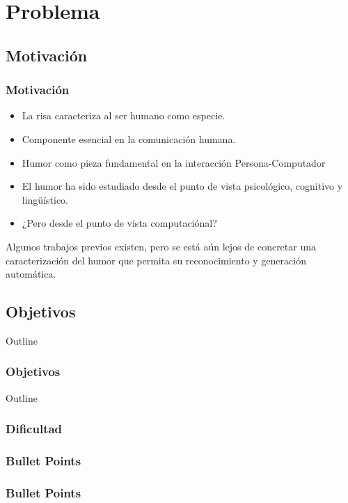 \section{Problema} 

\subsection{Motivación}

\begin{frame}[allowframebreaks]
\frametitle{Motivación}
\begin{itemize}
\item La risa caracteriza al ser humano como especie.
\item Componente esencial en la comunicación humana.
\item Humor como pieza fundamental en la interacción Persona-Computador
\end{itemize}
\framebreak
\begin{itemize}
\item El humor ha sido estudiado desde el punto de vista psicológico, cognitivo y lingüístico.
\item ¿Pero desde el punto de vista computaciónal?
\end{itemize}
Algunos trabajos previos existen, pero se está aún lejos de concretar una caracterización del humor que permita su reconocimiento y generación automática.

\end{frame}

\subsection{Objetivos} %

\begin{frame}[allowframebreaks]{Outline}
\frametitle{Objetivos}

\end{frame}


\begin{frame}[allowframebreaks]{Outline}
\frametitle{Dificultad}

\end{frame}

\begin{frame}
\frametitle{Bullet Points}

\end{frame}


\begin{frame}
\frametitle{Bullet Points}

\end{frame}